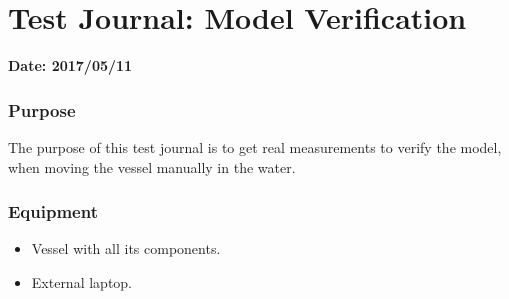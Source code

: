 \chapter{Test Journal: Model Verification}\label{app:modelVerification}

\textbf{Date: 2017/05/11}

\subsection*{Purpose}
The purpose of this test journal is to get real measurements to verify the model, when moving the vessel manually in the water.


\subsection*{Equipment}
\begin{itemize}
	\item Vessel with all its components.
	\item External laptop.
\end{itemize}

